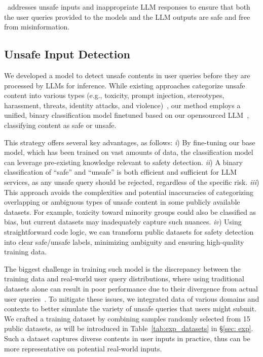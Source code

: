 \vspace{-1em}

\section{\goodname~\detection}\label{sec:safety_detector}


\detection~addresses unsafe inputs and inappropriate LLM responses to ensure that both the user queries provided to the models and the LLM outputs are safe and free from misinformation. 
\subsection{Unsafe Input Detection}\label{sec: unsafe_input_detection}

We developed a model to detect unsafe contents in user queries before they are processed by LLMs for inference.
While existing approaches categorize unsafe content into various types (e.g.,  toxicity, prompt injection, stereotypes, harassment, threats, identity attacks, and violence)~\citep{openai-data-paper,Wang2023DecodingTrustAC,Detoxify}, our method employs a unified, binary classification model finetuned based on our opensourced LLM~\citep{fox}, classifying content as  safe or unsafe.


This strategy offers several key advantages, as follows: \textit{i}) By fine-tuning our base model, which has been trained on vast amounts of data, the classification model can leverage pre-existing knowledge relevant to safety detection.
\textit{ii}) A binary classification of ``safe'' and ``unsafe'' is both efficient and sufficient for LLM services, as any unsafe query should be rejected, regardless of the specific risk.
\textit{iii}) This approach avoids the complexities and potential inaccuracies of categorizing overlapping or ambiguous types of unsafe content in some publicly available datasets. For example, toxicity toward minority groups could also be classified as bias, but current datasets may inadequately capture such nuances.
\textit{iv}) Using straightforward code logic, we can transform public datasets for safety detection into clear safe/unsafe labels, minimizing ambiguity and ensuring high-quality training data.





The biggest challenge in training such model is the discrepancy between the training data and real-world user query distributions, where using traditional datasets alone can result in poor performance due to their divergence from actual user queries~\citep{openai-data-paper}.
To mitigate these issues, we integrated data of various domains and contexts to better simulate the variety of unsafe queries that users might submit.
We crafted a training dataset
by combining samples randomly selected from 15 public datasets, as will be introduced in Table~\ref{tab:exp_datasets} in \S\ref{sec: exp}. 
Such a dataset captures  diverse contents in user inputs in practice, thus can be more representative on potential real-world inputs. 


